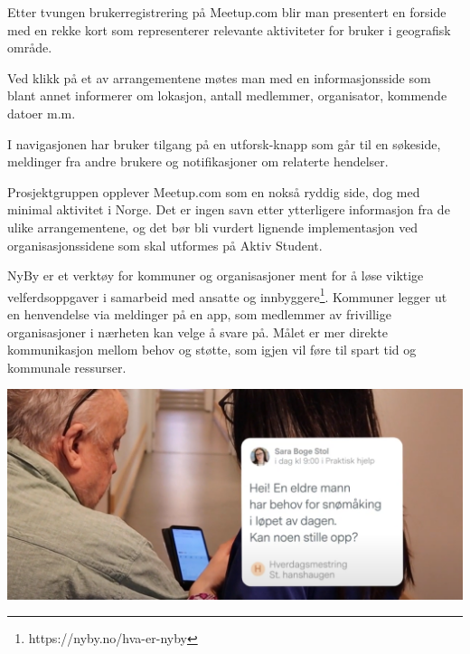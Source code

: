 Etter tvungen brukerregistrering på Meetup.com blir man presentert en forside med en rekke kort som representerer relevante aktiviteter for bruker i geografisk område. 

\vspace{5mm} %

Ved klikk på et av arrangementene møtes man med en informasjonsside som blant annet informerer om lokasjon, antall medlemmer, organisator, kommende datoer m.m.

\vspace{5mm} %

I navigasjonen har bruker tilgang på en utforsk-knapp som går til en søkeside, meldinger fra andre brukere og notifikasjoner om relaterte hendelser.

\vspace{5mm} %

Prosjektgruppen opplever Meetup.com som en nokså ryddig side, dog med minimal aktivitet i Norge. Det er ingen savn etter ytterligere informasjon fra de ulike arrangementene, og det bør bli vurdert lignende implementasjon ved organisasjonssidene som skal utformes på Aktiv Student.

\newpage

NyBy er et verktøy for kommuner og organisasjoner ment for å løse viktige velferdsoppgaver i samarbeid med ansatte og innbyggere\footnote{https://nyby.no/hva-er-nyby}. Kommuner legger ut en henvendelse via meldinger på en app, som medlemmer av frivillige organisasjoner i nærheten kan velge å svare på. Målet er mer direkte kommunikasjon mellom behov og støtte, som igjen vil føre til spart tid og kommunale ressurser.

\vspace{5mm} %

\includegraphics[width=\textwidth]{Illustrasjoner/andre_platformer/nyby_henvendelse.png}

